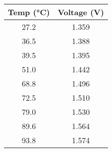 \begin{tabular}{cc}
	\toprule
	\textbf{Temp (°C)} & \textbf{Voltage (V)} \\
	\midrule
	27.2 & 1.359 \\
	36.5 & 1.388 \\
	39.5 & 1.395 \\
	51.0 & 1.442 \\
	68.8 & 1.496 \\
	72.5 & 1.510 \\
	79.0 & 1.530 \\
	89.6 & 1.564 \\
	93.8 & 1.574 \\
	\bottomrule
\end{tabular}